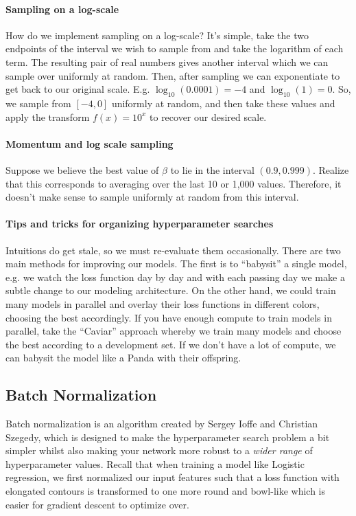 \documentclass[12pt]{article}
\begin{document}
\paragraph{Sampling on a log-scale}
How do we implement sampling on a log-scale? It's simple, take the two endpoints of the interval 
we wish to sample from and take the logarithm of each term. The resulting pair of real numbers gives another interval
which we can sample over uniformly at random. Then, after sampling we can exponentiate to get back to our original scale. E.g. $\log_{10}(0.0001) = -4$ and $\log_{10}(1) = 0$. So, we sample from $[-4, 0]$ uniformly at random, and then take these values and apply the transform $f(x) = 10^x$ to recover our desired scale.

\paragraph{Momentum and log scale sampling} Suppose we believe the best value of $\beta$ to lie in the interval
$(0.9, 0.999)$. Realize that this corresponds to averaging over the last 10 or 1,000 values. Therefore, it doesn't make sense to sample uniformly at random from this interval.

\paragraph{Tips and tricks for organizing hyperparameter searches} Intuitions do get stale, so we must 
re-evaluate them occasionally. There are two main methods for improving our models. The first is to ``babysit''
a single model, e.g. we watch the loss function day by day and with each passing day we make a subtle change to our
modeling architecture. On the other hand, we could train many models in parallel and overlay their loss functions
in different colors, choosing the best accordingly. If you have enough compute to train models in parallel, take the ``Caviar'' approach whereby we train many models and choose the best according to a development set. If we don't have a lot of compute, we can babysit the model like a Panda with their offspring.

\subsection{Batch Normalization}
Batch normalization is an algorithm created by Sergey Ioffe and Christian Szegedy, which is designed to make the
hyperparameter search problem a bit simpler whilst also making your network more robust to a \emph{wider range} 
of hyperparameter values. Recall that when training
a model like Logistic regression, we first normalized our input features such that a loss function 
with elongated contours is transformed to one more round and bowl-like which is easier for gradient descent to
optimize over.
\end{document}
